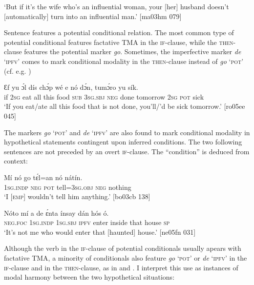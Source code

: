 \glt ‘But if it’s the wife who’s an influential woman, your [her] husband
doesn’t [automatically] turn into an influential man.’ [ma03hm 079]
\z

Sentence  features a potential conditional relation. The most common type of potential conditional features factative TMA in the \textsc{if-}clause, while the \textsc{then-}clause features the potential marker \textit{go}. Sometimes, the imperfective marker \textit{de} ‘\textsc{ipfv’} comes to mark conditional modality in the \textsc{then-}clause instead of \textit{go} \textsc{‘pot’} (cf. e.g. )


\ea%
    \label{ex:key:1524}
    \gll Ɛf  yu    ɔ́l  dís  chɔ́p  wé  e    nó  dɔ́n,
tumɔ́ro    yu    sík.\\
if  \textsc{2sg}  eat    all  this  food    \textsc{sub}  \textsc{3sg.sbj}  \textsc{neg}  done
tomorrow  \textsc{2sg}  \textsc{pot}  sick\\

\glt ‘If you eat/ate all this food that is not done, you’ll/’d be
sick tomorrow.’ [ro05ee 045]
\z

The markers \textit{go} ‘\textsc{pot}’  and \textit{de} ‘\textsc{ipfv’}  are also found to mark conditional modality in hypothetical statements contingent upon inferred conditions. The two following sentences are not preceded by an overt \textsc{if-}clause. The “condition” is deduced from context: 


\ea%
    \label{ex:key:1525}
    \gll Mí    nó  go  tɛ́l=an    nó  nátín.\\
\textsc{1sg.indp}  \textsc{neg}  \textsc{pot}  tell=\textsc{3sg.obj}  \textsc{neg}  nothing\\

\glt ‘I \textsc{[emp]} wouldn’t tell him anything.’ [bo03cb 138]
\z


\ea%
    \label{ex:key:1526}
    \gll Nóto  mí    a    de  ɛ́nta    ínsay  dán  hós    ó.\\
\textsc{neg}.\textsc{foc}  \textsc{1sg.indp}  \textsc{1sg.sbj}  \textsc{ipfv}  enter  inside  that  house  \textsc{sp}\\

\glt ‘It’s not me who would enter that [haunted] house.’ [ne05fn 031]
\z

Although the verb in the \textsc{if-}clause of potential conditionals usually apears with factative TMA, a minority of conditionals also feature \textit{go} ‘\textsc{pot}’ or \textit{de} ‘\textsc{ipfv}’ in the \textsc{if-}clause and in the \textsc{then-}clause, as in  and . I interpret this use as instances of modal harmony between the two hypothetical situations:


